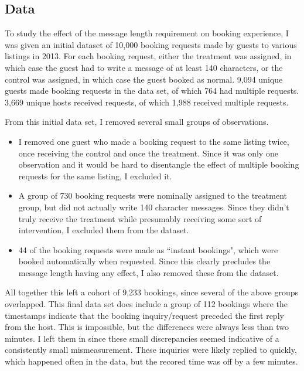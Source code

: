 \documentclass[11pt]{article}
\theoremstyle{definition}
\begin{document}
\subsection{Data}
To study the effect of the message length requirement on booking experience, I was given an initial dataset of 10,000 booking requests made by guests to various listings in 2013. For each booking request, either the treatment was assigned, in which case the guest had to write a message of at least 140 characters, or the control was assigned, in which case the guest booked as normal. 9,094 unique guests made booking requests in the data set, of which 764 had multiple requests. 3,669 unique hosts received requests, of which 1,988 received multiple requests. \par
From this initial data set, I removed several small groups of observations. 
\begin{itemize}
    \item I removed one guest who made a booking request to the same listing twice, once receiving the control and once the treatment. Since it was only one observation and it would be hard to disentangle the effect of multiple booking requests for the same listing, I excluded it.
    \item A group of 730 booking requests were nominally assigned to the treatment group, but did not actually write 140 character messages. Since they didn't truly receive the treatment while presumably receiving some sort of intervention, I excluded them from the dataset. 
    \item 44 of the booking requests were made as ``instant bookings", which were booked automatically when requested. Since this clearly precludes the message length having any effect, I also removed these from the dataset.
\end{itemize}
All together this left a cohort of 9,233 bookings, since several of the above groups overlapped. This final data set does include a group of 112 bookings where the timestamps indicate that the booking inquiry/request preceded the first reply from the host. This is impossible, but the differences were always less than two minutes. I left them in since these small discrepancies seemed indicative of a consistently small mismeasurement. These inquiries were likely replied to quickly, which happened often in the data, but the recored time was off by a few minutes. 
\end{document}
